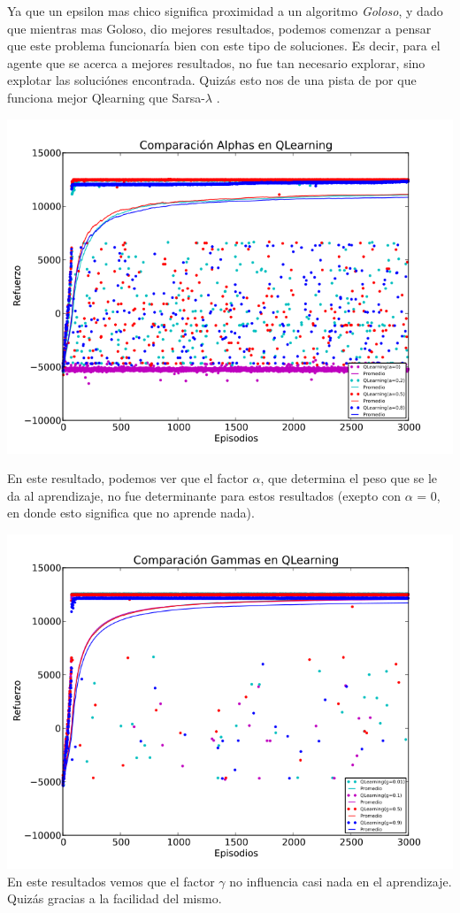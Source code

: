 \documentclass[11pt, a4paper]{article}
\newcommand{\slambda}{Sarsa-$\lambda$ }
\begin{document}
Ya que un epsilon mas chico significa proximidad a un algoritmo \textit{Goloso}, y dado que mientras mas Goloso, dio mejores resultados, podemos comenzar a pensar que este problema funcionar\'ia bien con este tipo de soluciones. 
Es decir, para el agente que se acerca a mejores resultados, no fue tan necesario explorar, sino explotar las soluci\'ones encontrada. Quiz\'as esto nos de una pista de por que funciona mejor Qlearning que \slambda.

\includegraphics[scale=0.6]{Graf3}

En este resultado, podemos ver que el factor $\alpha$, que determina el peso que se le da al aprendizaje, no fue determinante para estos resultados (exepto con $\alpha$ = 0, en donde esto significa que no aprende nada).

\includegraphics[scale=0.6]{Graf4}
En este resultados vemos que el factor $\gamma$ no influencia casi nada en el aprendizaje. Quiz\'as gracias a la facilidad del mismo.
\end{document}
